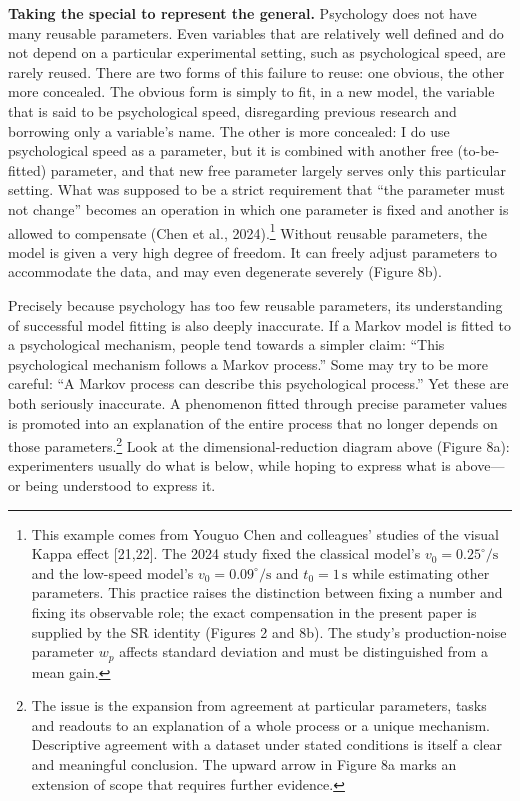 \documentclass[11pt,a4paper]{article}
\begin{document}
\textbf{Taking the special to represent the general.} Psychology does
not have many reusable parameters. Even variables that are relatively
well defined and do not depend on a particular experimental setting,
such as psychological speed, are rarely reused. There are two forms of
this failure to reuse: one obvious, the other more concealed. The
obvious form is simply to fit, in a new model, the variable that is said
to be psychological speed, disregarding previous research and borrowing
only a variable's name. The other is more concealed: I do use
psychological speed as a parameter, but it is combined with another free
(to-be-fitted) parameter, and that new free parameter largely serves
only this particular setting. What was supposed to be a strict
requirement that “the parameter must not change” becomes an operation
in which one parameter is fixed and another is allowed to compensate
(Chen et al., 2024).\footnote{This example comes from Youguo Chen and
  colleagues' studies of the visual Kappa effect {[}21,22{]}. The 2024
  study fixed the classical model's \(v_0=0.25^\circ/\mathrm{s}\) and
  the low-speed model's \(v_0=0.09^\circ/\mathrm{s}\) and
  \(t_0=1\,\mathrm{s}\) while estimating other parameters. This practice
  raises the distinction between fixing a number and fixing its
  observable role; the exact compensation in the present paper is
  supplied by the SR identity (Figures 2 and 8b). The study's
  production-noise parameter \(w_p\) affects standard deviation and must
  be distinguished from a mean gain.} Without reusable parameters, the
model is given a very high degree of freedom. It can freely adjust
parameters to accommodate the data, and may even degenerate severely
(Figure 8b).

Precisely because psychology has too few reusable parameters, its
understanding of successful model fitting is also deeply inaccurate. If
a Markov model is fitted to a psychological mechanism, people tend
towards a simpler claim: “This psychological mechanism follows a Markov
process.” Some may try to be more careful: “A Markov process can
describe this psychological process.” Yet these are both seriously
inaccurate. A phenomenon fitted through precise parameter values is
promoted into an explanation of the entire process that no longer
depends on those parameters.\footnote{The issue is the expansion from
  agreement at particular parameters, tasks and readouts to an
  explanation of a whole process or a unique mechanism. Descriptive
  agreement with a dataset under stated conditions is itself a clear and
  meaningful conclusion. The upward arrow in Figure 8a marks an
  extension of scope that requires further evidence.} Look at the
dimensional-reduction diagram above (Figure 8a): experimenters usually
do what is below, while hoping to express what is above—or being
understood to express it.
\end{document}

